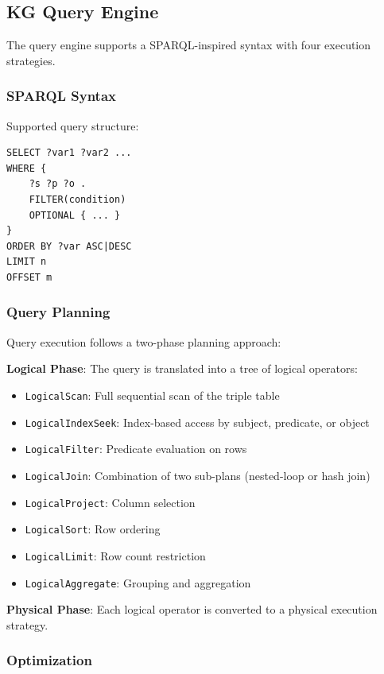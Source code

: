 \subsection{KG Query Engine}

The query engine supports a SPARQL-inspired syntax with four execution strategies.

\subsubsection{SPARQL Syntax}

Supported query structure:

\begin{verbatim}
SELECT ?var1 ?var2 ...
WHERE {
    ?s ?p ?o .
    FILTER(condition)
    OPTIONAL { ... }
}
ORDER BY ?var ASC|DESC
LIMIT n
OFFSET m
\end{verbatim}

\subsubsection{Query Planning}

Query execution follows a two-phase planning approach:

\textbf{Logical Phase}: The query is translated into a tree of logical operators:
\begin{itemize}
    \item \texttt{LogicalScan}: Full sequential scan of the triple table
    \item \texttt{LogicalIndexSeek}: Index-based access by subject, predicate, or object
    \item \texttt{LogicalFilter}: Predicate evaluation on rows
    \item \texttt{LogicalJoin}: Combination of two sub-plans (nested-loop or hash join)
    \item \texttt{LogicalProject}: Column selection
    \item \texttt{LogicalSort}: Row ordering
    \item \texttt{LogicalLimit}: Row count restriction
    \item \texttt{LogicalAggregate}: Grouping and aggregation
\end{itemize}

\textbf{Physical Phase}: Each logical operator is converted to a physical execution strategy.

\subsubsection{Optimization}

